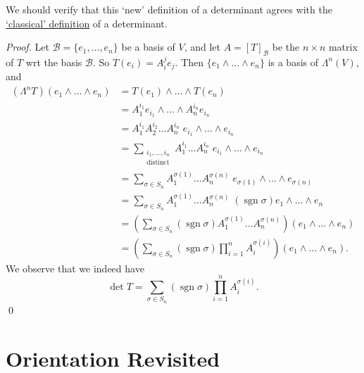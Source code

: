 \documentclass[notoc,notitlepage]{tufte-book}
\DeclareMathOperator{\sgn}{sgn}
\begin{document}
\begin{note}
  We should verify that this `new' definition of a determinant agrees with the
  \href{https://en.wikipedia.org/wiki/Determinant\#n_\%C3\%97_n_matrices}{`classical' definition}
  of a determinant.
\end{note}

\begin{proof}
  Let $\mathcal{B} = \{ e_1, \ldots, e_n \}$ be a basis of $V$, and let
  $A = [T]_{\mathcal{B}}$ be the $n \times n$ matrix of $T$ wrt the basis 
  $\mathcal{B}$. So $T(e_i) = A_i^j e_j$. Then $\{ e_1 \land \hdots \land e_n \}$
  is a basis of $\Lambda^n(V)$, and
  \begin{align*}
    \left( \Lambda^n T \right)(e_1 \land \hdots \land e_n)
    &= T(e_1) \land \hdots \land T(e_n) \\
    &= A_1^{i_1} e_{i_1} \land \hdots \land A_n^{i_n} e_{i_n} \\
    &= A_1^{i_1} A_2^{i_2} \hdots A_n^{i_n} \; e_{i_1} \land \hdots \land e_{i_n} \\
    &= \sum_{\substack{i_1, \ldots, i_n \\ \text{distinct}}} A_1^{i_1} \hdots A_n^{i_n} \;
      e_{i_1} \land \hdots \land e_{i_n} \\
    &= \sum_{\sigma \in S_n} A_1^{\sigma(1)} \hdots A_n^{\sigma(n)} \;
      e_{\sigma(1)} \land \hdots \land e_{\sigma(n)} \\
    &= \sum_{\sigma \in S_n} A_1^{\sigma(1)} \hdots A_n^{\sigma(n)} \;
      (\sgn \sigma) e_1 \land \hdots \land e_n \\
    &= \left( \sum_{\sigma \in S_n} (\sgn \sigma) A_1^{\sigma(1)} \hdots A_n^{\sigma(n)} \right)
      \left( e_1 \land \hdots \land e_n \right) \\
    &= \left( \sum_{\sigma \in S_n} (\sgn \sigma) \prod_{i = 1}^{n} A_i^{\sigma(i)} \right)
      \left( e_1 \land \hdots \land e_n \right).
  \end{align*}
  We observe that we indeed have
  \begin{equation*}
    \det T = \sum_{\sigma \in S_n} (\sgn \sigma) \prod_{i = 1}^{n} A_i^{\sigma(i)}.
  \end{equation*}\qed\
\end{proof}


\section{Orientation Revisited}%
\label{sec:orientation_revisited}
\end{document}
